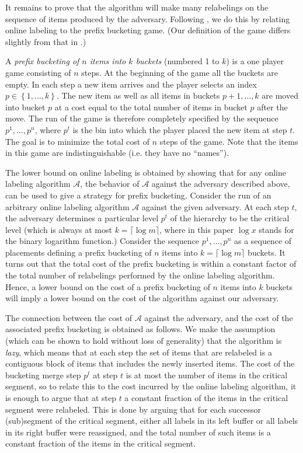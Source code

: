 \documentclass[unicode,review]{siamart1116}
\newcommand{\A}{\mathcal{A}}
\newcommand{\natInt}[2]{ \left\{ #1, \dotsc, #2 \right\} }
\numberwithin{theorem}{section}
\begin{document}
It remains to prove that the algorithm will make many relabelings on the sequence
of items produced by the adversary.  Following  \cite{DSZ04}, we 
do this by relating online labeling to the prefix bucketing game.
(Our definition of the game differs slightly from that in \cite{DSZ04}.)

A \emph{prefix bucketing of $n$ items into $k$  buckets} (numbered 1 to $k$) is a one player game consisting of $n$ steps.
At the beginning of the game
all the buckets are empty. In each step a new item arrives and the player selects an index $p \in \natInt{1}{k}$.
The new item as well as all items in buckets $p+1,\dotsc,k$ are moved into bucket $p$ at a cost equal to the
total number of items in bucket $p$ after the move.   The run of the game is therefore completely specified by
the sequence $p^1,\ldots,p^n$, where $p^t$ is the bin into which the player placed the new item at step $t$. 
The goal is to minimize the total cost of $n$ steps
of the game.   
Note that the items in this game are indistinguishable (i.e. they have no ``names'').

The lower bound on online labeling is obtained by showing that for any online
labeling algorithm $\A$, the behavior of $\A$ against the adversary described above, can be used to
give a strategy for prefix bucketing.
Consider the run of an arbitrary online labeling algorithm $\A$
against the given adversary.  At each step $t$, the adversary determines a particular
level $p^t$ of the hierarchy to be the critical level (which is always at most $k=\lceil \log m \rceil$,
where in this paper $\log x$ stands for the binary logarithm function.)
 Consider the sequence $p^1,\ldots,p^n$ as a  sequence of placements defining a prefix bucketing
of $n$ items into $k=\lceil \log m \rceil$ buckets. It turns out that
the total cost of the prefix bucketing is within a constant factor of  the total number of relabelings
performed by the online labeling algorithm. Hence, a lower bound on the cost of a prefix bucketing of $n$ items into $k$
buckets will imply a lower bound on the cost of the algorithm against our adversary.

The connection between the cost of $\A$ against the adversary, and the cost of the associated
prefix bucketing is obtained as follows.
We  make the assumption (which can be shown to hold without loss of generality) that the algorithm is \emph{lazy}, which means
that at each  step the set of items that are relabeled is a contiguous block of items that includes
the newly inserted items.    The cost of the bucketing merge step $p^t$ at step $t$ 
is at most the number of items in
the critical segment, so to relate this to the cost incurred by the online labeling algorithm, it is enough
to argue that at step $t$ a constant fraction of the items in the critical segment were relabeled.  This is done
by arguing that  for each successor (sub)segment of the critical segment, either all labels in its left buffer
or all labels in its right buffer were reassigned, and the total number of such items is a constant fraction of the items
in the critical segment.
\end{document}
